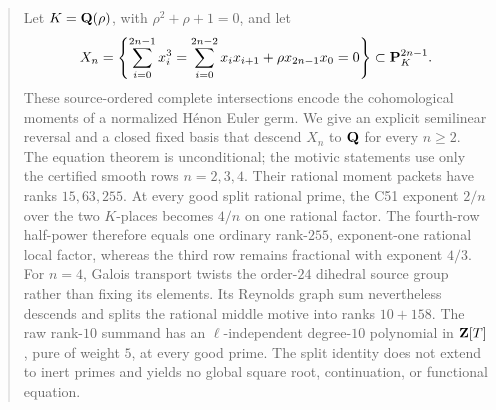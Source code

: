 \begin{abstract}
Let \(K=\Q(\rho)\), with \(\rho^2+\rho+1=0\), and let
\[
X_n=\left\{\sum_{i=0}^{2n-1}x_i^3=
\sum_{i=0}^{2n-2}x_ix_{i+1}+\rho x_{2n-1}x_0=0\right\}
\subset\PP_K^{2n-1}.
\]
These source-ordered complete intersections encode the cohomological
moments of a normalized H\'enon Euler germ.  We give an explicit
semilinear reversal and a closed fixed basis that descend \(X_n\) to
\(\Q\) for every \(n\ge2\).  The equation theorem is unconditional; the
motivic statements use only the certified smooth rows \(n=2,3,4\).
Their rational moment packets have ranks \(15,63,255\).  At every good
split rational prime, the C51 exponent \(2/n\) over the two \(K\)-places
becomes \(4/n\) on one rational factor.  The fourth-row half-power
therefore equals one ordinary rank-\(255\), exponent-one rational local
factor, whereas the third row remains fractional with exponent \(4/3\).
For \(n=4\), Galois transport twists the order-\(24\) dihedral source
group rather than fixing its elements.  Its Reynolds graph sum nevertheless
descends and splits the rational middle motive into ranks \(10+158\).
The raw rank-\(10\) summand has an \(\ell\)-independent degree-\(10\)
polynomial in \(\Z[T]\), pure of weight \(5\), at every good prime.
The split identity does not extend to inert primes and yields no global
square root, continuation, or functional equation.
\end{abstract}
